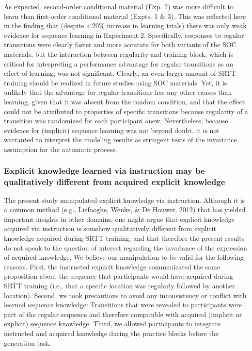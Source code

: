 \documentclass[floatsintext,man]{apa6}
\begin{document}
As expected, second-order conditional material (Exp. 2) was more
difficult to learn than first-order conditional material (Expts. 1 \&
3). This was reflected here in the finding that (despite a 20\% increase
in learning trials) there was only weak evidence for sequence learning
in Experiment 2. Specifically, responses to regular transitions were
clearly faster and more accurate for both variants of the SOC materials,
but the interaction between regularity and training block, which is
critical for interpreting a performance advantage for regular
transitions as an effect of learning, was not significant. Clearly, an
even larger amount of SRTT training should be realized in future studies
using SOC materials. Yet, it is unlikely that the advantage for regular
transitions has any other causes than learning, given that it was absent
from the random condition, and that the effect could not be attributed
to properties of specific transitions because regularity of a transition
was randomized for each participant anew. Nevertheless, because evidence
for (implicit) sequence learning was not beyond doubt, it is not
warranted to interpret the modeling results as stringent tests of the
invariance assumption for the automatic process.

\subsubsection{Explicit knowledge learned via instruction may be
qualitatively different from acquired explicit
knowledge}\label{explicit-knowledge-learned-via-instruction-may-be-qualitatively-different-from-acquired-explicit-knowledge}

The present study manipulated explicit knowledge via instruction.
Although it is a common method (e.g., Liefooghe, Wenke, \& De Houwer,
2012) that has yielded important insights in other domains, one might
argue that explicit knowledge acquired via instruction is somehow
qualitatively different from explicit knowledge acquired during SRTT
training, and that therefore the present results do not speak to the
question of interest regarding the invariance of the expression of
acquired knowledge. We believe our manipulation to be valid for the
following reasons. First, the instructed explicit knowledge communicated
the same proposition about the sequence that participants would have
acquired during SRTT training (i.e., that a specific location was
regularly followed by another location). Second, we took precautions to
avoid any inconsistency or conflict with learned sequence knowledge:
Transitions that were revealed to participants were part of the regular
sequence and therefore compatible with acquired (implicit or explicit)
sequence knowledge. Third, we allowed participants to integrate
instructed and acquired knowledge during the practice blocks before the
generation task.
\end{document}
